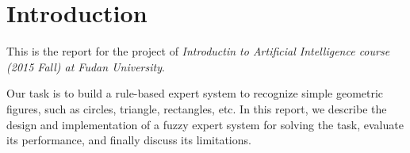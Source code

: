 \section{Introduction}

This is the report for the project of {\it Introductin to Artificial Intelligence course (2015 Fall) at Fudan University}.

Our task is to build a rule-based expert system to recognize simple geometric figures, such as circles, triangle, rectangles, etc. In this report, we describe the design and implementation of a fuzzy expert system for solving the task, evaluate its performance, and finally discuss its limitations.
